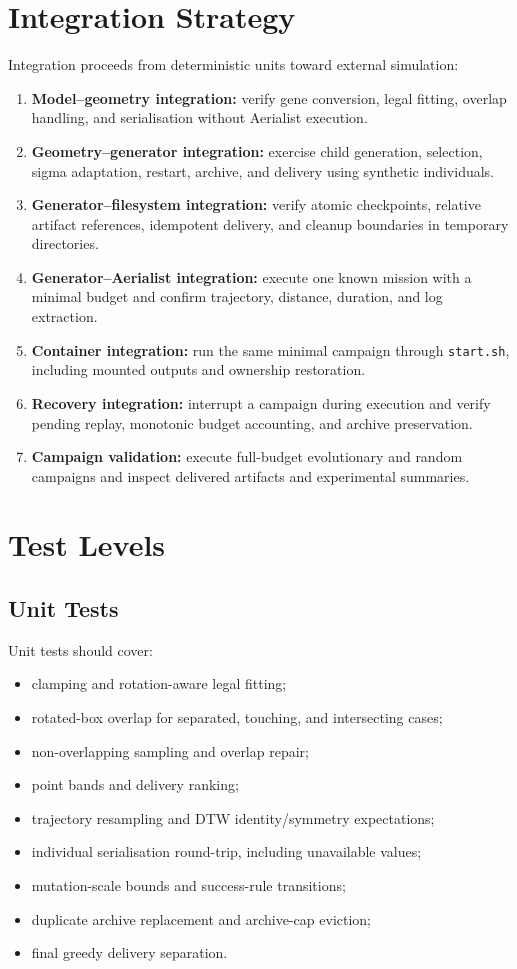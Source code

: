 \documentclass[11pt,a4paper,openany]{report}
\newcommand{\code}[1]{\texttt{#1}}
\begin{document}
\section{Integration Strategy}
Integration proceeds from deterministic units toward external simulation:
\begin{enumerate}
  \item \textbf{Model--geometry integration:} verify gene conversion, legal fitting, overlap handling, and serialisation without Aerialist execution.
  \item \textbf{Geometry--generator integration:} exercise child generation, selection, sigma adaptation, restart, archive, and delivery using synthetic individuals.
  \item \textbf{Generator--filesystem integration:} verify atomic checkpoints, relative artifact references, idempotent delivery, and cleanup boundaries in temporary directories.
  \item \textbf{Generator--Aerialist integration:} execute one known mission with a minimal budget and confirm trajectory, distance, duration, and log extraction.
  \item \textbf{Container integration:} run the same minimal campaign through \code{start.sh}, including mounted outputs and ownership restoration.
  \item \textbf{Recovery integration:} interrupt a campaign during execution and verify pending replay, monotonic budget accounting, and archive preservation.
  \item \textbf{Campaign validation:} execute full-budget evolutionary and random campaigns and inspect delivered artifacts and experimental summaries.
\end{enumerate}

\section{Test Levels}

\subsection{Unit Tests}
Unit tests should cover:
\begin{itemize}
  \item clamping and rotation-aware legal fitting;
  \item rotated-box overlap for separated, touching, and intersecting cases;
  \item non-overlapping sampling and overlap repair;
  \item point bands and delivery ranking;
  \item trajectory resampling and DTW identity/symmetry expectations;
  \item individual serialisation round-trip, including unavailable values;
  \item mutation-scale bounds and success-rule transitions;
  \item duplicate archive replacement and archive-cap eviction;
  \item final greedy delivery separation.
\end{itemize}
\end{document}
